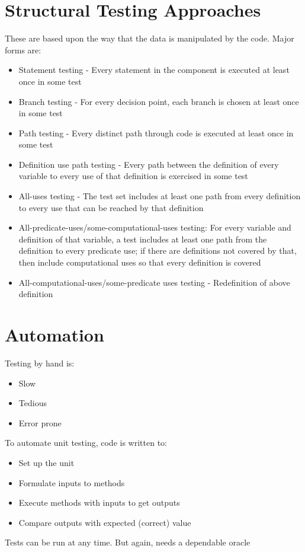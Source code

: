 \documentclass{article}[18pt]
\begin{document}
\section{Structural Testing Approaches}
These are based upon the way that the data is manipulated by the code. Major forms are:
\begin{itemize}
	\item Statement testing  - Every statement in the component is executed at least once in some test
	\item Branch testing - For every decision point, each branch is chosen at least once in some test
	\item Path testing - Every distinct path through code is executed at least once in some test
	\item Definition use path testing - Every path between the definition of every variable to every use of that definition is exercised in some test
	\item All-uses testing - The test set includes at least one path from every definition to every use that can be reached by that definition
	\item All-predicate-uses/some-computational-uses testing: For every variable and definition of that variable, a test includes at least one path from the definition to every predicate use; if there are definitions not covered by that, then include computational uses so that every definition is covered
	\item All-computational-uses/some-predicate uses testing - Redefinition of above definition
\end{itemize}
\section{Automation}
Testing by hand is:
\begin{itemize}
	\item Slow
	\item Tedious
	\item Error prone
\end{itemize}
To automate unit testing, code is written to:
\begin{itemize}
	\item Set up the unit
	\item Formulate inputs to methods
	\item Execute methods with inputs to get outputs
	\item Compare outputs with expected (correct) value
\end{itemize}
Tests can be run at any time. But again, needs a dependable oracle
\end{document}
